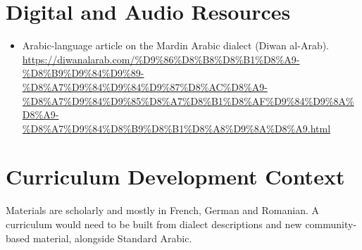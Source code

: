\documentclass[12pt]{article}
\begin{document}
\section{Digital and Audio Resources}
\begin{itemize}
\item Arabic-language article on the Mardin Arabic dialect (Diwan al-Arab). \url{https://diwanalarab.com/%D9%86%D8%B8%D8%B1%D8%A9-%D8%B9%D9%84%D9%89-%D8%A7%D9%84%D9%84%D9%87%D8%AC%D8%A9-%D8%A7%D9%84%D9%85%D8%A7%D8%B1%D8%AF%D9%84%D9%8A%D8%A9-%D8%A7%D9%84%D8%B9%D8%B1%D8%A8%D9%8A%D8%A9.html}
\end{itemize}

\section{Curriculum Development Context}
Materials are scholarly and mostly in French, German and Romanian. A curriculum would need to be built from dialect descriptions and new community-based material, alongside Standard Arabic.
\end{document}
